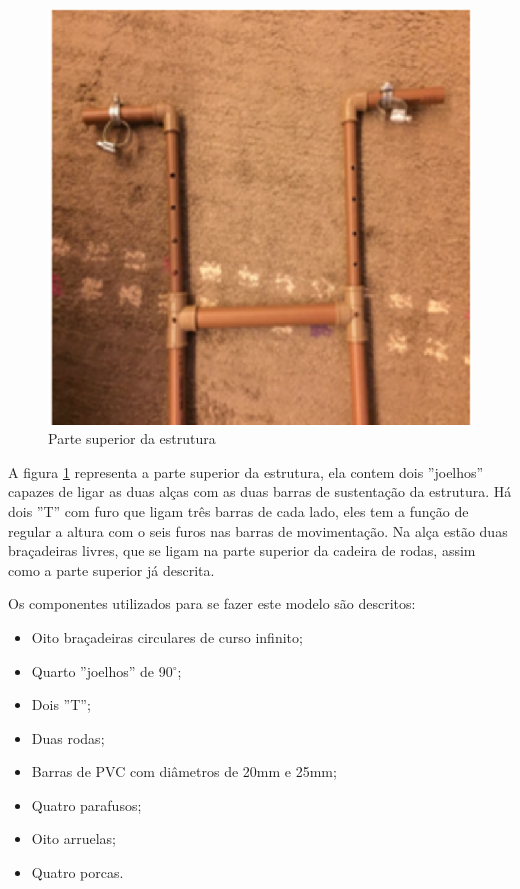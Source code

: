 \begin{figure}[!htb]
\centering
\includegraphics[keepaspectratio=true,scale=0.7]{figuras/resultados/superior_estrutura}
\caption{Parte superior da estrutura}
\label{fig:superior_estrutura}
\end{figure}

A figura \ref{fig:superior_estrutura} representa a parte superior da estrutura, ela contem dois ''joelhos'' capazes de ligar as duas alças com as duas barras de sustentação da estrutura. Há dois ''T'' com furo que ligam três barras de cada lado, eles tem a função de regular a altura com o seis furos nas barras de movimentação. Na alça estão duas braçadeiras livres, que se ligam na parte superior da cadeira de rodas, assim como a parte superior já descrita.

Os componentes utilizados para se fazer este modelo são descritos:
\begin{itemize}
  \item Oito braçadeiras circulares de curso infinito;
  \item Quarto ''joelhos'' de 90$^\circ$;
  \item Dois ''T'';
  \item Duas rodas;
  \item Barras de PVC com diâmetros de 20mm e 25mm;
  \item Quatro parafusos;
  \item Oito arruelas;
  \item Quatro porcas.
\end{itemize}

